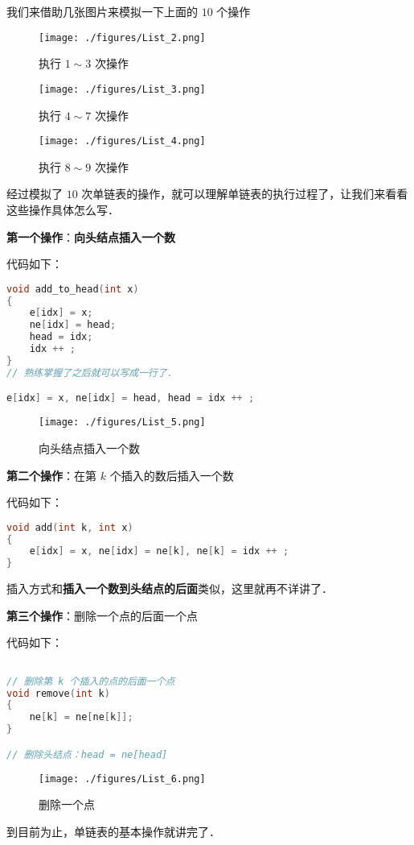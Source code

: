 我们来借助几张图片来模拟一下上面的 $10$ 个操作

\begin{figure}[ht]
\centering
\texttt{[image: ./figures/List\_2.png]}
\caption{执行 $1\sim3$ 次操作} \label{List_fig2}
\end{figure}

\begin{figure}[ht]
\centering
\texttt{[image: ./figures/List\_3.png]}
\caption{执行 $4\sim7$ 次操作} \label{List_fig3}
\end{figure}

\begin{figure}[ht]
\centering
\texttt{[image: ./figures/List\_4.png]}
\caption{执行 $8\sim9$ 次操作} \label{List_fig4}
\end{figure}

经过模拟了 $10$ 次单链表的操作，就可以理解单链表的执行过程了，让我们来看看这些操作具体怎么写．

\textbf{第一个操作}：\textbf{向头结点插入一个数}

代码如下：

\begin{lstlisting}[language=cpp]
void add_to_head(int x) 
{
    e[idx] = x;
    ne[idx] = head;
    head = idx;
    idx ++ ;
}
// 熟练掌握了之后就可以写成一行了．

e[idx] = x, ne[idx] = head, head = idx ++ ;
\end{lstlisting}

\begin{figure}[ht]
\centering
\texttt{[image: ./figures/List\_5.png]}
\caption{向头结点插入一个数} \label{List_fig5}
\end{figure}



\textbf{第二个操作}：在第 $k$ 个插入的数后插入一个数


代码如下：

\begin{lstlisting}[language=cpp]
void add(int k, int x)
{
    e[idx] = x, ne[idx] = ne[k], ne[k] = idx ++ ;
}
\end{lstlisting}

插入方式和\textbf{插入一个数到头结点的后面}类似，这里就再不详讲了．

\textbf{第三个操作}：删除一个点的后面一个点

代码如下：

\begin{lstlisting}[language=cpp]

// 删除第 k 个插入的点的后面一个点
void remove(int k)
{
    ne[k] = ne[ne[k]];
}

// 删除头结点：head = ne[head]
\end{lstlisting}

\begin{figure}[ht]
\centering
\texttt{[image: ./figures/List\_6.png]}
\caption{删除一个点} \label{List_fig6}
\end{figure}

到目前为止，单链表的基本操作就讲完了．